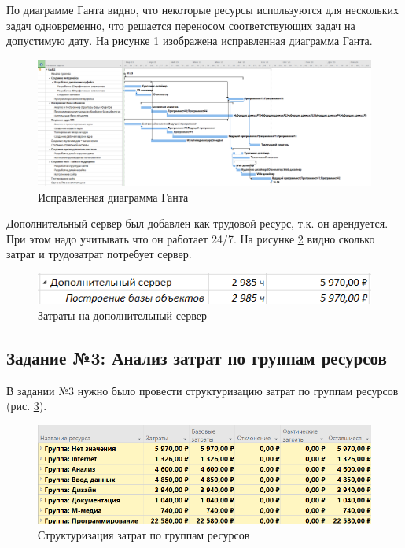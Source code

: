 По диаграмме Ганта видно, что некоторые ресурсы используются для нескольких задач одновременно, что решается переносом соответствующих задач на допустимую дату. На рисунке \ref{p6} изображена исправленная диаграмма Ганта.

\begin{figure}[!h]
	\centering
	\includegraphics[width=1\linewidth]{inc/img/6.png}
	\caption{Исправленная диаграмма Ганта}
	\label{p6}
\end{figure}

Дополнительный сервер был добавлен как трудовой ресурс, т.к. он арендуется. При этом надо учитывать что он работает 24/7. На рисунке \ref{p66} видно сколько затрат и трудозатрат потребует сервер.

\begin{figure}[!h]
	\centering
	\includegraphics[width=1\linewidth]{inc/img/6.0.png}
	\caption{Затраты на дополнительный сервер}
	\label{p66}
\end{figure}

\newpage
\subsection*{Задание №3: Анализ затрат по группам ресурсов}
В задании №3 нужно было провести структуризацию затрат по группам ресурсов (рис. \ref{p7}).
\begin{figure}[!h]
	\centering
	\includegraphics[width=1\linewidth]{inc/img/7.png}
	\caption{Структуризация затрат по группам ресурсов}
	\label{p7}
\end{figure}

